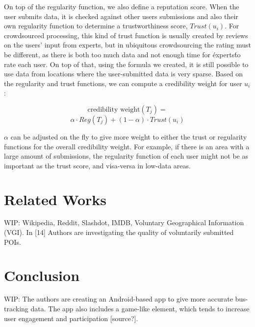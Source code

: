 \documentclass[10pt,twocolumn]{article}
\begin{document}
	    On top of the regularity function, we also define a reputation score. When the user submits data, it is checked against other users submissions and also their own regularity function to determine a trustworthiness score, $Trust(u_i)$. For crowdsourced processing, this kind of trust function is usually created by reviews on the users' input from experts, but in ubiquitous crowdsourcing the rating must be different, as there is both too much data and not enough time for \'experts\' to rate each user. On top of that, using the formula we created, it is still possible to use data from locations where the user-submitted data is very sparse. Based on the regularity and trust functions, we can compute a credibility weight for user $u_i$:
	    
	    $$\text{credibility weight} (T_j) = $$ $$\alpha \cdot Reg(T_j) + (1 - \alpha) \cdot Trust(u_i)$$
	    
        $\alpha$ can be adjusted on the fly to give more weight to either the trust or regularity functions for the overall credibility weight. For example, if there is an area with a large amount of submissions, the regularity function of each user might not be as important as the trust score, and visa-versa in low-data areas.
	    
	\section*{Related Works}
	    WIP: Wikipedia, Reddit, Slashdot, IMDB, Voluntary Geographical Information (VGI). In [14] Authors are investigating the quality of voluntarily submitted POIs.
	    
	\section*{Conclusion}
	    WIP: The authors are creating an Android-based app to give more accurate bus-tracking data. The app also includes a game-like element, which tends to increase user engagement and participation [source?]. 
	
	
\end{document}

